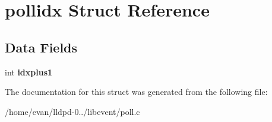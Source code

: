 \section{pollidx \-Struct \-Reference}
\label{structpollidx}
\subsection*{\-Data \-Fields}
\begin{DoxyCompactItemize}
\item 
int {\bfseries idxplus1}\label{structpollidx_ad15c2c6f7db3126f6459cb6e757c6dfb}

\end{DoxyCompactItemize}


\-The documentation for this struct was generated from the following file\-:\begin{DoxyCompactItemize}
\item 
/home/evan/lldpd-\/0../libevent/poll.\-c\end{DoxyCompactItemize}
